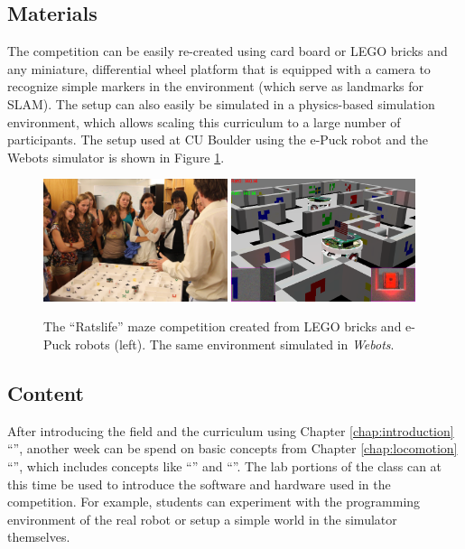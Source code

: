 \documentclass[paper=6.14in:9.21in,pagesize=pdftex,11pt,twoside,openright]{scrbook}
\begin{document}
\subsection{Materials}
The competition can be easily re-created using card board or LEGO bricks and any miniature, differential wheel platform that is equipped with a camera to recognize simple markers in the environment (which serve as landmarks for SLAM). The setup can also easily be simulated in a physics-based simulation environment, which allows scaling this curriculum to a large number of participants. The setup used at CU Boulder using the e-Puck robot and the Webots simulator is shown in Figure \ref{fig:ratslifereal}.

\begin{figure}[!htb]
\includegraphics[width=0.48\textwidth]{figs/ratslife_real}
\includegraphics[width=0.48\textwidth]{figs/ratslife_webots}
\caption{\label{fig:ratslifereal}The ``Ratslife'' maze competition created from LEGO bricks and e-Puck robots (left). The same environment simulated in \emph{Webots}.}
\end{figure}

\subsection{Content}\label{sec:curr1content}
After introducing the field and the curriculum using Chapter \ref{chap:introduction} ``'', another week can be spend on basic concepts from Chapter \ref{chap:locomotion} ``'', which includes concepts like ``'' and ``''. The lab portions of the class can at this time be used to introduce the software and hardware used in the competition. For example, students can experiment with the programming environment of the real robot or setup a simple world in the simulator themselves.
\end{document}
